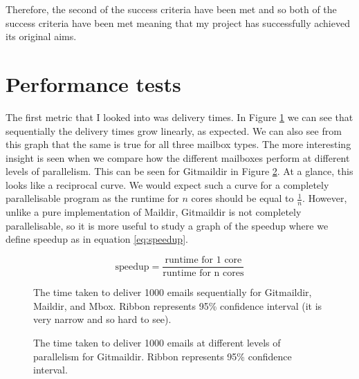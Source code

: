 Therefore, the second of the success criteria have been met and so both of the success criteria have been met meaning that my project has successfully achieved its original aims.

\section{Performance tests}

The first metric that I looked into was delivery times. In Figure \ref{fig:tds_combined} we can see that sequentially the delivery times grow linearly, as expected. We can also see from this graph that the same is true for all three mailbox types. The more interesting insight is seen when we compare how the different mailboxes perform at different levels of parallelism. This can be seen for Gitmaildir in Figure \ref{fig:tdpp}. At a glance, this looks like a reciprocal curve. We would expect such a curve for a completely parallelisable program as the runtime for $n$ cores should be equal to $\frac{1}{n}$. However, unlike a pure implementation of Maildir, Gitmaildir is not completely parallelisable, so it is more useful to study a graph of the speedup where we define speedup as in equation \ref{eq:speedup}.

\begin{equation} \label{eq:speedup}
\textrm{speedup} = \frac{\textrm{runtime for 1 core}}{\textrm{runtime for n cores}}
\end{equation}

\begin{figure}[h]
    \centering
    
    \caption{The time taken to deliver 1000 emails sequentially for Gitmaildir, Maildir, and Mbox. Ribbon represents 95\% confidence interval (it is very narrow and so hard to see).}
    \label{fig:tds_combined}
\end{figure}


\begin{figure}[h]
    \centering
    
    \caption{The time taken to deliver 1000 emails at different levels of parallelism for Gitmaildir. Ribbon represents 95\% confidence interval.}
    \label{fig:tdpp}
\end{figure}

